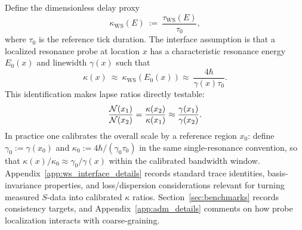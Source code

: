 Define the dimensionless delay proxy
\begin{equation}
  \kappa_{\mathrm{WS}}(E)\ :=\ \frac{\tau_{\mathrm{WS}}(E)}{\tau_0},
\end{equation}
where $\tau_0$ is the reference tick duration.
The interface assumption is that a localized resonance probe at location $x$ has a characteristic resonance energy $E_0(x)$ and linewidth $\gamma(x)$ such that
\begin{equation}
  \kappa(x)\ \approx\ \kappa_{\mathrm{WS}}\!\left(E_0(x)\right)
  \approx\ \frac{4\hbar}{\gamma(x)\tau_0}.
  \label{eq:ws_kappa_identification}
\end{equation}
This identification makes lapse ratios directly testable:
\begin{equation}
  \frac{\mathcal{N}(x_1)}{\mathcal{N}(x_2)}
  = \frac{\kappa(x_2)}{\kappa(x_1)}
  \approx \frac{\gamma(x_1)}{\gamma(x_2)}.
\end{equation}
In practice one calibrates the overall scale by a reference region $x_0$:
define $\gamma_0:=\gamma(x_0)$ and $\kappa_0:=4\hbar/(\gamma_0\tau_0)$ in the same single-resonance convention, so that $\kappa(x)/\kappa_0\approx \gamma_0/\gamma(x)$ within the calibrated bandwidth window.
Appendix~\ref{app:ws_interface_details} records standard trace identities, basis-invariance properties, and loss/dispersion considerations relevant for turning measured $S$-data into calibrated $\kappa$ ratios.
Section~\ref{sec:benchmarks} records consistency targets, and Appendix~\ref{app:adm_details} comments on how probe localization interacts with coarse-graining.


